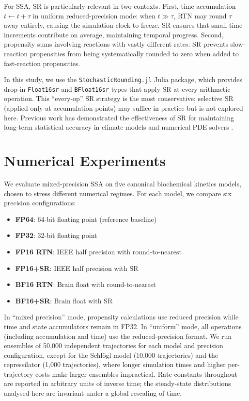 \documentclass{article}
\begin{document}
For SSA, SR is particularly relevant in two contexts. First, time accumulation $t \leftarrow t + \tau$ in uniform reduced-precision mode: when $t \gg \tau$, RTN may round $\tau$ away entirely, causing the simulation clock to freeze. SR ensures that small time increments contribute on average, maintaining temporal progress. Second, propensity sums involving reactions with vastly different rates: SR prevents slow-reaction propensities from being systematically rounded to zero when added to fast-reaction propensities.

In this study, we use the \texttt{StochasticRounding.jl} Julia package, which provides drop-in \texttt{Float16sr} and \texttt{BFloat16sr} types that apply SR at every arithmetic operation. This ``every-op'' SR strategy is the most conservative; selective SR (applied only at accumulation points) may suffice in practice but is not explored here. Previous work has demonstrated the effectiveness of SR for maintaining long-term statistical accuracy in climate models \cite{kimpson2024} and numerical PDE solvers \cite{croci2022}.


\section{Numerical Experiments}
\label{sec:experiments}

We evaluate mixed-precision SSA on five canonical biochemical kinetics models, chosen to stress different numerical regimes. For each model, we compare six precision configurations:
\begin{itemize}
    \item \textbf{FP64}: 64-bit floating point (reference baseline)
    \item \textbf{FP32}: 32-bit floating point
    \item \textbf{FP16 RTN}: IEEE half precision with round-to-nearest
    \item \textbf{FP16+SR}: IEEE half precision with SR
    \item \textbf{BF16 RTN}: Brain float with round-to-nearest
    \item \textbf{BF16+SR}: Brain float with SR
\end{itemize}
In ``mixed precision'' mode, propensity calculations use reduced precision while time and state accumulators remain in FP32. In ``uniform'' mode, all operations (including accumulation and time) use the reduced-precision format. We run ensembles of 50,000 independent trajectories for each model and precision configuration, except for the Schl\"{o}gl model (10,000 trajectories) and the repressilator (1,000 trajectories), where longer simulation times and higher per-trajectory costs make larger ensembles impractical. Rate constants throughout are reported in arbitrary units of inverse time; the steady-state distributions analysed here are invariant under a global rescaling of time.
\end{document}

